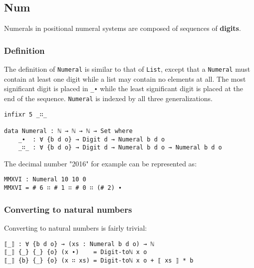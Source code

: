 \documentclass[../thesis.tex]{subfiles}
\begin{document}
%
%

\subsection{Num}

Numerals in positional numeral systems are composed of sequences of \textbf{digits}.

\subsubsection{Definition}
The definition of {\lstinline|Numeral|} is similar to that of {\lstinline|List|},
except that a {\lstinline|Numeral|} must contain at least one digit while a list
may contain no elements at all. The most significant digit is placed in {\lstinline|_∙|}
while the least significant digit is placed at the end of the sequence.
{\lstinline|Numeral|} is indexed by all three generalizations.

\begin{lstlisting}
infixr 5 _∷_

data Numeral : ℕ → ℕ → ℕ → Set where
    _∙  : ∀ {b d o} → Digit d → Numeral b d o
    _∷_ : ∀ {b d o} → Digit d → Numeral b d o → Numeral b d o
\end{lstlisting}

The decimal number "2016" for example can be represented as:

\begin{lstlisting}
MMXVI : Numeral 10 10 0
MMXVI = # 6 ∷ # 1 ∷ # 0 ∷ (# 2) ∙
\end{lstlisting}

\subsubsection{Converting to natural numbers}

Converting to natural numbers is fairly trivial:

\begin{lstlisting}
⟦_⟧ : ∀ {b d o} → (xs : Numeral b d o) → ℕ
⟦_⟧ {_} {_} {o} (x ∙)    = Digit-toℕ x o
⟦_⟧ {b} {_} {o} (x ∷ xs) = Digit-toℕ x o + ⟦ xs ⟧ * b
\end{lstlisting}
\end{document}
